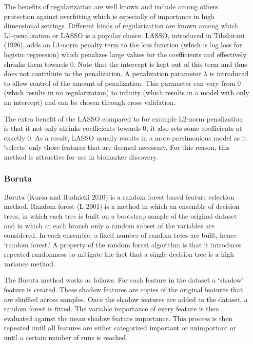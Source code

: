 \documentclass[
]{article}
\begin{document}
The benefits of regularization are well known and include among others protection against overfitting which is especially of importance in high dimensional settings. Different kinds of regularization are known among which L1-penalization or LASSO is a popular choice. LASSO, introduced in Tibshirani (1996), adds an L1-norm penalty term to the loss function (which is log loss for logistic regression) which penalizes large values for the coefficients and effectively shrinks them towards 0. Note that the intercept is kept out of this term and thus does not contribute to the penalization. A penalization parameter \(\lambda\) is introduced to allow control of the amount of penalization. This parameter can vary from 0 (which results in no regularization) to infinity (which results in a model with only an intercept) and can be chosen through cross validation.

The extra benefit of the LASSO compared to for example L2-norm penalization is that it not only shrinks coefficients towards 0, it also sets some coefficients at exactly 0. As a result, LASSO usually results in a more parsimonious model as it `selects' only those features that are deemed necessary. For this reason, this method is attractive for use in biomarker discovery.

\hypertarget{intro-Boruta}{%
\subsubsection{Boruta}\label{intro-Boruta}}

Boruta (Kursa and Rudnicki 2010) is a random forest based feature selection method. Random forest (L 2001) is a method in which an ensemble of decision trees, in which each tree is built on a bootstrap sample of the original dataset and in which at each branch only a random subset of the variables are considered. In each ensemble, a fixed number of random trees are built, hence `random forest.' A property of the random forest algorithm is that it introduces repeated randomness to mitigate the fact that a single decision tree is a high variance method.

The Boruta method works as follows. For each feature in the dataset a `shadow' feature is created. These shadow features are copies of the original features that are shuffled across samples. Once the shadow features are added to the dataset, a random forest is fitted. The variable importance of every feature is then evaluated against the mean shadow feature importance. This process is then repeated until all features are either categorized important or unimportant or until a certain number of runs is reached.
\end{document}
